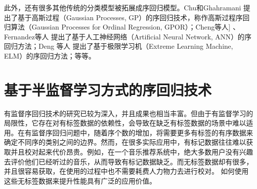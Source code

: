 此外，还有很多其他传统的分类模型被拓展成序回归模型。Chu和Ghahramani\citep{chu2005gaussian}
提出了基于高斯过程（Gaussian Processes, GP\citep{rasmussen2006gaussian}）的序回归技术，称作高斯过程序回归算法（Gaussian Processes for Ordinal Regression, GPOR）；Cheng等人]\citep{cheng2008neural}
、Fernandez等人\citep{fernandez2013negative}
提出了基于人工神经网络（Artificial Neural Network, ANN\citep{jain1996artificial}）的序回归方法；Deng 等人\citep{deng2010ordinal}
提出了基于极限学习机（Extreme Learning Machine,  ELM\citep{huang2006extreme}）的序回归方法；等等。

\section{基于半监督学习方式的序回归技术}
有监督序回归技术的研究已较为深入，并且成果也相当丰富。但由于有监督学习的局限性，它存在对有标签数据的依赖性，会导致在缺乏有标签数据的场景中难以适用。在有监督序回归问题中，随着序个数的增加，将需要更多有标签的有序数据来确定不同序的类别之间的边界。然而，在很多实际应用中，有标记数据往往难以获取并且校对起来代价昂贵。例如，在一个音乐推荐系统中，绝大多数用户没有兴趣去评价他们已经听过的音乐，从而导致有标记数据缺乏。而无标签数据却有很多，并且很容易获取，在使用的过程中也不需要耗费人力物力去进行校对。 如何使用这些无标签数据来提升性能具有广泛的应用价值。

